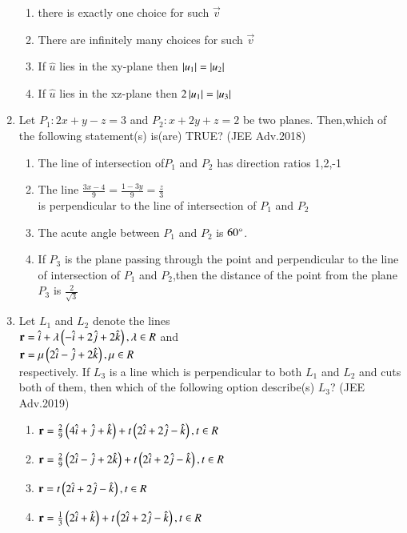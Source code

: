 \documentclass[journal]{IEEEtran}
\numberwithin{equation}{enumi}
\numberwithin{figure}{enumi}
\begin{document}
\begin{enumerate}
		\begin{enumerate}
			\item there is exactly one choice for such $\vec{v}$
			\item There are infinitely many choices for such $\vec{v}$
			\item If $\hat{u}$ lies in the xy-plane then $\left\vert u_1\right\vert= \left\vert u_2\right\vert$
			\item If $\hat{u}$ lies in the xz-plane then $2\left\vert u_1\right\vert=\left\vert u_3\right\vert$
		\end{enumerate}
	\item Let $P_1:2x+y-z=3$ and $P_2:x+2y+z=2$ be two planes. Then,which of the following statement(s) is(are) TRUE? \hfill{(JEE Adv.2018)}
		\begin{enumerate}
			\item The line of intersection of$P_1$ and $P_2$ has direction ratios 1,2,-1
			\item The line $\frac{3x-4}{9}=\frac{1-3y}{9}=\frac{z}{3}$ \\ is perpendicular to the line of intersection of $P_1$ and $P_2$
			\item The acute angle between $P_1$ and $P_2$ is $60\degree$.
			\item If $P_3$ is the plane passing through the point  and perpendicular to the line of intersection of $P_1$ and $P_2$,then the distance of the point 
				from the plane $P_3$ is $\frac{2}{\sqrt{3}}$
		\end{enumerate}
	\item Let $L_1$ and $L_2$ denote the lines\\ $\mathbf{r}=\hat{i}+\lambda\left(-\hat{i}+2\hat{j}+2\hat{k}\right), \lambda \in R$ and \\
		$\mathbf{r}=\mu \left(2\hat{i}-\hat{j}+2\hat{k}\right), \mu \in R$\\ respectively. If $L_3$ is a line which is perpendicular to both $L_1$ and $L_2$ and cuts both of them, then which of 
		the following option describe(s) $L_3$? \hfill{(JEE Adv.2019)}
		\begin{enumerate}
			\item $\mathbf{r}=\frac{2}{9}\left(4\hat{i}+\hat{j}+\hat{k}\right)+t\left(2\hat{i}+2\hat{j}-\hat{k}\right),t \in R$
			\item $\mathbf{r}=\frac{2}{9}\left(2\hat{i}-\hat{j}+2\hat{k}\right)+t\left(2\hat{i}+2\hat{j}-\hat{k}\right), t \in R$
			\item $\mathbf{r}=t\left(2\hat{i}+2\hat{j}-\hat{k}\right),t \in R$
			\item $\mathbf{r}=\frac{1}{3}\left(2\hat{i}+\hat{k}\right)+t\left(2\hat{i}+2\hat{j}-\hat{k}\right),t \in R$
		\end{enumerate}
\end{enumerate}
\end{document}
